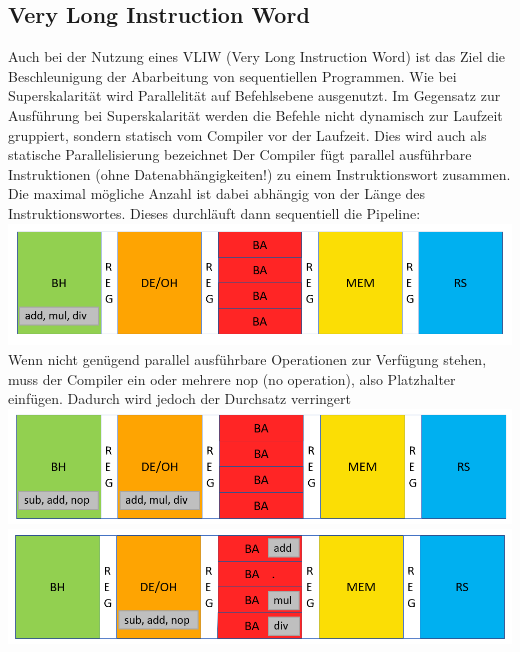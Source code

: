 	\subsection{Very Long Instruction Word}
		Auch bei der Nutzung eines VLIW (Very Long Instruction Word) ist das Ziel die Beschleunigung der Abarbeitung von sequentiellen Programmen. Wie bei Superskalarität wird Parallelität auf Befehlsebene ausgenutzt. Im Gegensatz zur Ausführung bei Superskalarität werden die Befehle nicht dynamisch zur Laufzeit gruppiert, sondern statisch vom Compiler vor der Laufzeit. Dies wird auch als statische Parallelisierung bezeichnet \newline \newline
		Der Compiler fügt parallel ausführbare Instruktionen (ohne Datenabhängigkeiten!) zu einem Instruktionswort zusammen. Die maximal mögliche Anzahl ist dabei abhängig von der Länge des Instruktionswortes. Dieses durchläuft dann sequentiell die Pipeline: \newline
		\includegraphics[scale=0.6]{VLIW_1.png}
		Wenn nicht genügend parallel ausführbare Operationen zur Verfügung stehen, muss der Compiler ein oder mehrere nop (no operation), also Platzhalter einfügen. Dadurch wird jedoch der Durchsatz verringert \newline
		\includegraphics[scale=0.6]{VLIW_2.png} \newline
		\includegraphics[scale=0.6]{VLIW_3.png}